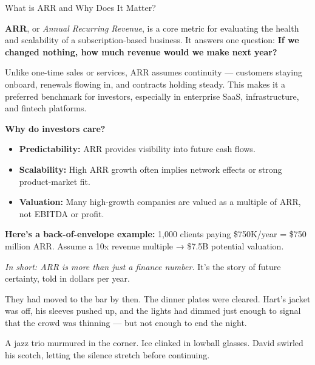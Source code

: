 \medskip

\begin{TechnicalSidebar}{What is ARR and Why Does It Matter?}

  \textbf{ARR}, or \textit{Annual Recurring Revenue}, is a core metric for evaluating the health and scalability of 
  a subscription-based business.  
  It answers one question: \textbf{If we changed nothing, how much revenue would we make next year?}
  
  \medskip
  
  Unlike one-time sales or services, ARR assumes continuity — customers staying onboard, renewals flowing in, and 
  contracts holding steady.  
  This makes it a preferred benchmark for investors, especially in enterprise SaaS, infrastructure, and 
  fintech platforms.
  
  \medskip
  
  \textbf{Why do investors care?}

  \medskip
  
  \begin{itemize}
    \item \textbf{Predictability:} ARR provides visibility into future cash flows.
    \item \textbf{Scalability:} High ARR growth often implies network effects or strong product-market fit.
    \item \textbf{Valuation:} Many high-growth companies are valued as a multiple of ARR, not EBITDA or profit.
  \end{itemize}
  
  \medskip
  
  \textbf{Here's a back-of-envelope example:}  
  1,000 clients paying \$750K/year = \$750 million ARR.  
  Assume a 10x revenue multiple → \$7.5B potential valuation.
  
  \medskip
  
  \textit{In short: ARR is more than just a finance number.}  
  It’s the story of future certainty, told in dollars per year.
  
\end{TechnicalSidebar}

\medskip

They had moved to the bar by then. The dinner plates were cleared. Hart’s jacket was off, his sleeves pushed up, and the 
lights had dimmed just enough to signal that the crowd was thinning — but not enough to end the night.

A jazz trio murmured in the corner. Ice clinked in lowball glasses. David swirled his scotch, letting the silence stretch 
before continuing.

